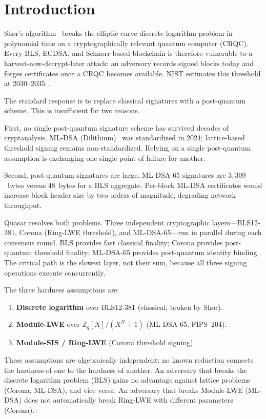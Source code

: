 \section{Introduction}

\label{sec:introduction}

Shor's algorithm~\cite{shor1994} breaks the elliptic curve discrete logarithm
problem in polynomial time on a cryptographically relevant quantum computer
(CRQC). Every BLS, ECDSA, and Schnorr-based blockchain is therefore vulnerable
to a harvest-now-decrypt-later attack: an adversary records signed blocks today
and forges certificates once a CRQC becomes available. NIST estimates this
threshold at 2030--2035~\cite{mosca2018}.

The standard response is to replace classical signatures with a post-quantum
scheme. This is insufficient for two reasons.

First, no single post-quantum signature scheme has survived decades of
cryptanalysis. ML-DSA (Dilithium)~\cite{nist-pqc} was standardized in 2024;
lattice-based threshold signing remains non-standardized. Relying on a single
post-quantum assumption is exchanging one single point of failure for another.

Second, post-quantum signatures are large. ML-DSA-65 signatures are
$3{,}309$~bytes versus 48~bytes for a BLS aggregate. Per-block ML-DSA
certificates would increase block header size by two orders of magnitude,
degrading network throughput.

Quasar resolves both problems. Three independent cryptographic layers---BLS12-381,
Corona (Ring-LWE threshold), and ML-DSA-65---run in parallel during each
consensus round. BLS provides fast classical finality; Corona provides
post-quantum threshold finality; ML-DSA-65 provides post-quantum identity
binding. The critical path is the slowest layer, not their sum, because all
three signing operations execute concurrently.

The three hardness assumptions are:
\begin{enumerate}[leftmargin=2em]
\item \textbf{Discrete logarithm} over BLS12-381 (classical, broken by Shor).
\item \textbf{Module-LWE} over $\mathbb{Z}_q[X]/(X^N+1)$ (ML-DSA-65, FIPS~204).
\item \textbf{Module-SIS / Ring-LWE} (Corona threshold signing).
\end{enumerate}
These assumptions are algebraically independent: no known reduction connects
the hardness of one to the hardness of another. An adversary that breaks the
discrete logarithm problem (BLS) gains no advantage against lattice problems
(Corona, ML-DSA), and vice versa. An adversary that breaks Module-LWE
(ML-DSA) does not automatically break Ring-LWE with different parameters
(Corona).

